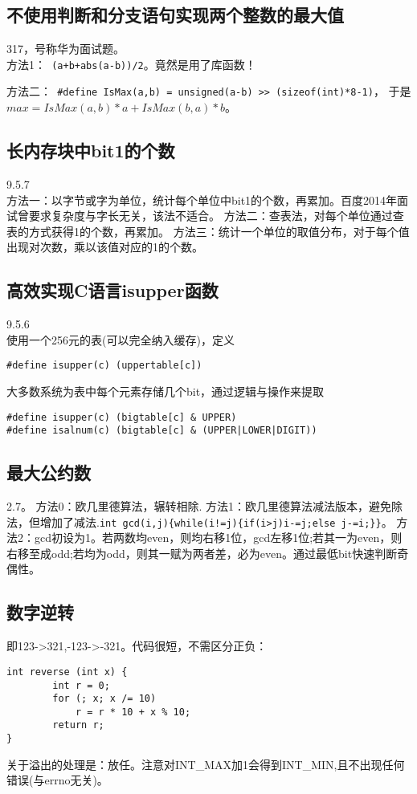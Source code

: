 \subsection{不使用判断和分支语句实现两个整数的最大值}
\cite{ccpppibible}317，号称华为面试题。\\
方法1：\verb$ (a+b+abs(a-b))/2$。竟然是用了库函数！

方法二：\verb$ #define IsMax(a,b) = unsigned(a-b) >> (sizeof(int)*8-1)$，
于是$max=IsMax(a,b)*a+IsMax(b,a)*b$。


\subsection{长内存块中bit1的个数}
\cite{pp}9.5.7\\
方法一：以字节或字为单位，统计每个单位中bit1的个数，再累加。百度2014年面试曾要求复杂度与字长无关，该法不适合。
方法二：查表法，对每个单位通过查表的方式获得1的个数，再累加。
方法三：统计一个单位的取值分布，对于每个值出现对次数，乘以该值对应的1的个数。

\subsection{高效实现C语言isupper函数}
\cite{pp}9.5.6\\
使用一个256元的表(可以完全纳入缓存)，定义
\begin{verbatim}
#define isupper(c) (uppertable[c])
\end{verbatim}
大多数系统为表中每个元素存储几个bit，通过逻辑与操作来提取
\begin{verbatim}
#define isupper(c) (bigtable[c] & UPPER)
#define isalnum(c) (bigtable[c] & (UPPER|LOWER|DIGIT))
\end{verbatim}


\subsection{最大公约数}
\cite{bop}2.7。\label{subsec:gcd}
方法0：欧几里德算法，辗转相除.
方法1：欧几里德算法减法版本，避免除法，但增加了减法.\verb|int gcd(i,j){while(i!=j){if(i>j)i-=j;else j-=i;}}|。
方法2：gcd初设为1。若两数均even，则均右移1位，gcd左移1位;若其一为even，则右移至成odd;若均为odd，则其一赋为两者差，必为even。通过最低bit快速判断奇偶性。


\subsection{数字逆转}
即123->321,-123->-321。代码很短，不需区分正负：
\begin{verbatim}
int reverse (int x) {
        int r = 0;
        for (; x; x /= 10)
            r = r * 10 + x % 10;
        return r;
}
\end{verbatim}
关于溢出的处理是：放任。注意对INT\_MAX加1会得到INT\_MIN,且不出现任何错误(与errno无关)。


